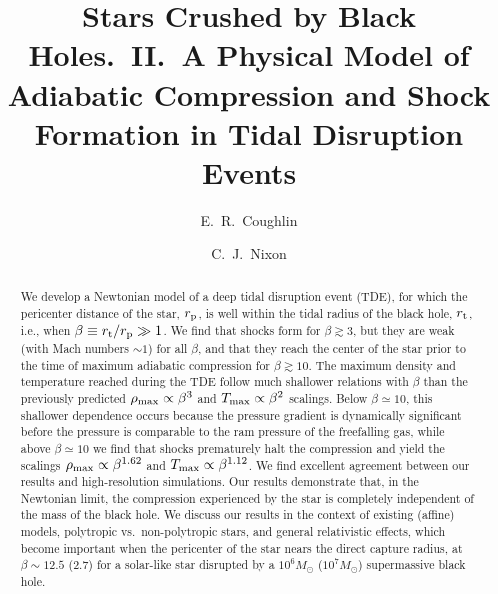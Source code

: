 \documentclass[twocolumn]{aastex62}
\begin{document}
\title{Stars Crushed by Black Holes.~II.~A Physical Model of Adiabatic Compression and Shock Formation in Tidal Disruption Events}
\author[0000-0003-3765-6401]{E.~R.~Coughlin}
\author[0000-0002-2137-4146]{C.~J.~Nixon}

%

\begin{abstract}
We develop a Newtonian model of a deep tidal disruption event (TDE), for which the pericenter distance of the star, $r_{\rm p}$, is well within the tidal radius of the black hole, $r_{\rm t}$, i.e., when $\beta \equiv r_{\rm t}/r_{\rm p} \gg 1$. We find that shocks form for $\beta \gtrsim 3$, but they are weak (with Mach numbers $\sim 1$) for all $\beta$, and that they reach the center of the star prior to the time of maximum adiabatic compression for $\beta \gtrsim 10$. The maximum density and temperature reached during the TDE follow much shallower relations with $\beta$ than the previously predicted $\rho_{\rm max} \propto \beta^3$ and $T_{\rm max} \propto \beta^2$ scalings. Below $\beta \simeq 10$, this shallower dependence occurs because the pressure gradient is dynamically significant before the pressure is comparable to the ram pressure of the freefalling gas, while above $\beta \simeq 10$ we find that shocks prematurely halt the compression and yield the scalings $\rho_{\rm max} \propto \beta^{1.62}$ and $T_{\rm max} \propto \beta^{1.12}$. We find excellent agreement between our results and high-resolution simulations. Our results demonstrate that, in the Newtonian limit, the compression experienced by the star is completely independent of the mass of the black hole. We discuss our results in the context of existing (affine) models, polytropic vs.~non-polytropic stars, and general relativistic effects, which become important when the pericenter of the star nears the direct capture radius, at $\beta \sim 12.5$ (2.7) for a solar-like star disrupted by a $10^6M_{\odot}$ ($10^{7}M_{\odot}$) supermassive black hole. 
\end{abstract}

\end{document}
